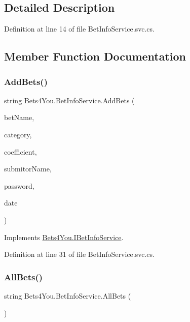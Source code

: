 \subsection{Detailed Description}


Definition at line 14 of file Bet\+Info\+Service.\+svc.\+cs.



\subsection{Member Function Documentation}
\mbox{\label{class_bets4_you_1_1_bet_info_service_a7e982447a6e04dcc798edef35ac73e43}} 
\subsubsection{\texorpdfstring{AddBets()}{AddBets()}}
{\footnotesize\ttfamily string Bets4\+You.\+Bet\+Info\+Service.\+Add\+Bets (\begin{DoxyParamCaption}\item[{string}]{bet\+Name,  }\item[{string}]{category,  }\item[{int}]{coefficient,  }\item[{string}]{submitor\+Name,  }\item[{string}]{password,  }\item[{Date\+Time}]{date }\end{DoxyParamCaption})}



Implements \mbox{\hyperlink{interface_bets4_you_1_1_i_bet_info_service_a15b9ce927d209a38ee245acf764755b1}{Bets4\+You.\+I\+Bet\+Info\+Service}}.



Definition at line 31 of file Bet\+Info\+Service.\+svc.\+cs.

\mbox{\label{class_bets4_you_1_1_bet_info_service_a911a79019d2aa6dc66aa4c14c6d3d500}} 
\subsubsection{\texorpdfstring{AllBets()}{AllBets()}}
{\footnotesize\ttfamily string Bets4\+You.\+Bet\+Info\+Service.\+All\+Bets (\begin{DoxyParamCaption}{ }\end{DoxyParamCaption})}



